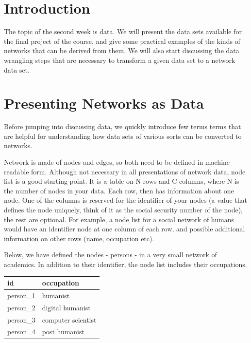 \documentclass[
]{book}
\begin{document}
\hypertarget{introduction-1}{%
\section{Introduction}\label{introduction-1}}

The topic of the second week is data. We will present the data sets available for the final project of the course,
and give some practical examples of the kinds of networks that can be derived from them. We will also start discussing the data wrangling steps that are necessary to transform a given data set to a network data set.

\hypertarget{presenting-networks-as-data}{%
\section{Presenting Networks as Data}\label{presenting-networks-as-data}}

Before jumping into discussing data, we quickly introduce few terms terms that are helpful for understanding how data sets of various
sorts can be converted to networks.

Network is made of nodes and edges, so both need to be defined in machine-readable form. Although not necessary in all presentations of network data, node list is a good starting point. It is a table on N rows and C columns, where N is the number of nodes in your data. Each row, then has information about one node. One of the columns is reserved for
the identifier of your nodes (a value that defines the node uniquely, think of it as the social security number of the node), the rest are optional. For example, a node list for a social network of humans would have an identifier node at one column of each row, and possible additional information on other rows (name, occupation etc).

Below, we have defined the nodes - persons - in a very small network of academics. In addition to their identifier,
the node list includes their occupations.

\begin{tabular}{l|l}
\hline
id & occupation\\
\hline
person\_1 & humanist\\
\hline
person\_2 & digital humanist\\
\hline
person\_3 & computer scientist\\
\hline
person\_4 & post humanist\\
\hline
\end{tabular}
\end{document}
